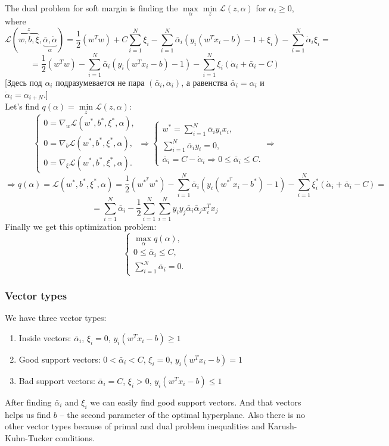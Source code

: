 The dual problem for soft margin is finding the $\max\limits_{\alpha}\min\limits_{z}\mathcal{L}(z,\alpha)$ for $\alpha_i\ge0$, where
$$\mathcal{L}(\overbrace{w,b,\xi}^{z},\underbrace{\bar\alpha,\dot\alpha}_{\alpha})=\frac{1}{2}(w^Tw)+C\sum\limits_{i=1}^{N}\xi_i-\sum\limits_{i=1}^{N}\bar\alpha_i(y_i(w^Tx_i-b)-1+\xi_i)-\sum\limits_{i=1}^{N}\dot\alpha_i\xi_i=$$
$$=\frac{1}{2}(w^Tw)-\sum\limits_{i=1}^{N}\bar\alpha_i(y_i(w^Tx_i-b)-1)-\sum\limits_{i=1}^{N}\xi_i(\dot\alpha_i+\bar\alpha_i-C)$$
[Здесь под $\alpha_i$ подразумевается не пара $(\bar\alpha_i,\dot\alpha_i)$, а равенства $\bar\alpha_i = \alpha_i$ и $\dot\alpha_i=\alpha_{i+N}$.]\\
Let's find $q(\alpha)=\min\limits_{z}\mathcal{L}(z,\alpha)$:
$$\begin{cases}
	0=\nabla_w\mathcal{L}(w^*,b^*,\xi^*,\alpha), \\
	0=\nabla_b\mathcal{L}(w^*,b^*,\xi^*,\alpha), \\
	0=\nabla_\xi\mathcal{L}(w^*,b^*,\xi^*,\alpha).
\end{cases}\Longrightarrow
\begin{cases}
	w^*=\sum\limits_{i=1}^{N}\bar\alpha_iy_ix_i, \\
	\sum\limits_{i=1}^{N}\bar\alpha_iy_i=0, \\
	\bar\alpha_i=C-\dot\alpha_i\Rightarrow 0\le\bar\alpha_i\le C.
\end{cases}\Longrightarrow$$
$$\Longrightarrow q(\alpha)=\mathcal{L}(w^*,b^*,\xi^*,\alpha)=\frac{1}{2}(w^{*^T}w^*)-\sum\limits_{i=1}^{N}\bar\alpha_i(y_i(w^{*^T}x_i-b^*)-1)-\sum\limits_{i=1}^{N}\xi_i^*(\dot\alpha_i+\bar\alpha_i-C)=$$
$$=\sum\limits_{i=1}^{N}\bar\alpha_i-\frac{1}{2}\sum\limits_{i=1}^{N}\sum\limits_{i=1}^{N}y_iy_j\bar\alpha_i\bar\alpha_jx_i^Tx_j$$
Finally we get this optimization problem:
$$\begin{cases}
	\max_{\alpha}q(\alpha), \\
	0\le\bar\alpha_i\le C, \\
	\sum\limits_{i=1}^{N}\bar\alpha_i=0.
\end{cases}$$

\subsubsection*{Vector types}

We have three vector types:
\begin{enumerate}[label=\arabic*.]
	\item Inside vectors: $\bar\alpha_i$, $\xi_i=0$, $y_i(w^Tx_i-b)\ge1$
	\item Good support vectors: $0<\bar\alpha_i<C$, $\xi_i=0$, $y_i(w^Tx_i-b)=1$
	\item Bad support vectors: $\bar\alpha_i=C$, $\xi_i>0$, $y_i(w^Tx_i-b)\le1$
\end{enumerate}
After finding $\bar\alpha_i$ and $\xi_i$ we can easily find good support vectors. And that vectors helps us find $b$ -- the second parameter of the optimal hyperplane. Also there is no other vector types because of primal and dual problem inequalities and Karush-Kuhn-Tucker conditions.

